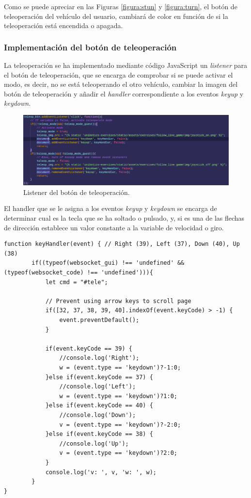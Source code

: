 \documentclass[a4paper, 12pt]{book}
\begin{document}
Como se puede apreciar en las Figuras \ref{figura:stun} y \ref{figura:turn}, el botón de teleoperación del vehículo del usuario, cambiará de color en función de si la teleoperación está encendida o apagada.

\subsubsection{Implementación del botón de teleoperación}
\label{follow_line_game_mode_teleoperado_impl}

La teleoperación se ha implementado mediante código JavaScript un \emph{listener} para el botón de teleoperación, que se encarga de comprobar si se puede activar el modo, es decir, no se está teleoperando el otro vehículo, cambiar la imagen del botón de teleoperación y añadir el \emph{handler} correspondiente a los eventos \emph{keyup} y \emph{keydown}.

\begin{figure}[H]
	\centering
    \includegraphics[width=17cm]{img/teleop_mode_code.png}
    \caption{Listener del botón de teleoperación.}
    \label{figura:difficulty_selector}
\end{figure}

El handler que se le asigna a los eventos \emph{keyup} y \emph{keydown} se encarga de determinar cual es la tecla que se ha soltado o pulsado, y, si es una de las flechas de dirección establece un valor constante a la variable de velocidad o giro.

\begin{lstlisting}[basicstyle=\tiny]
function keyHandler(event) { // Right (39), Left (37), Down (40), Up (38)
		if((typeof(websocket_gui) !== 'undefined' && (typeof(websocket_code) !== 'undefined'))){
			let cmd = "#tele";

			// Prevent using arrow keys to scroll page
			if([32, 37, 38, 39, 40].indexOf(event.keyCode) > -1) {
				event.preventDefault();
			}

			if(event.keyCode == 39) {
				//console.log('Right');
				w = (event.type == 'keydown')?-1:0;
			}else if(event.keyCode == 37) {
				//console.log('Left');
				w = (event.type == 'keydown')?1:0;
			}else if(event.keyCode == 40) {
				//console.log('Down');
				v = (event.type == 'keydown')?-2:0;
			}else if(event.keyCode == 38) {
				//console.log('Up');
				v = (event.type == 'keydown')?2:0;
			}
			console.log('v: ', v, 'w: ', w);
		}
}
\end{lstlisting}
\end{document}

